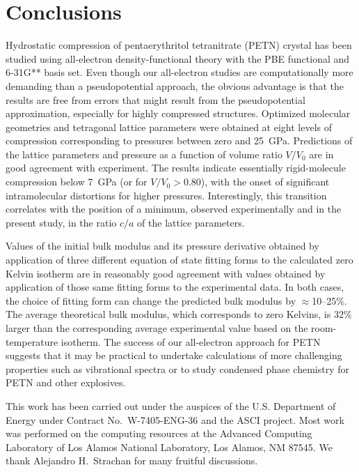 \documentclass[prb,aps,nobibnotes,twocolumn,doublespace,twocolumngrid,superbib]{revtex4}
\begin{document}
\section{Conclusions}
\label{sec:conclusions}
Hydrostatic compression of pentaerythritol tetranitrate (PETN) crystal
has been studied using all-electron density-functional theory with the
PBE functional and 6-31G** basis set. Even though our all-electron
studies are computationally more demanding than a pseudopotential
approach, the obvious advantage is that the results are free from
errors that might result from the pseudopotential approximation,
especially for highly compressed structures.  Optimized molecular
geometries and tetragonal lattice parameters were obtained at eight
levels of compression corresponding to pressures between zero and
25~GPa.  Predictions of the lattice parameters and pressure as a
function of volume ratio $V/V_0$ are in good agreement with
experiment. The results indicate essentially rigid-molecule
compression below 7~GPa (or for $V/V_0 > 0.80$), with the onset of
significant intramolecular distortions for higher pressures.  
Interestingly, this transition correlates with the position of a
minimum, observed experimentally and in the present study, in the 
ratio $c/a$ of the lattice parameters.

Values of the initial bulk modulus and its pressure derivative
obtained by application of three different equation of state fitting
forms to the calculated zero Kelvin isotherm are in reasonably good
agreement with values obtained by application of those same fitting
forms to the experimental data.  In both cases, the choice of fitting
form can change the predicted bulk modulus by $\approx$10--25\%.  The
average theoretical bulk modulus, which corresponds to zero Kelvins,
is 32\% larger than the corresponding average experimental value based
on the room-temperature isotherm.  The success of our all-electron
approach for PETN suggests that it may be practical to undertake 
calculations of more challenging properties such as vibrational spectra 
or to study condensed phase chemistry for PETN and other explosives.

\begin{acknowledgments}
This work has been carried out under the auspices of the
U.S. Department of Energy under Contract No.~W-7405-ENG-36 and the
ASCI project.  Most work was performed on the computing resources at
the Advanced Computing Laboratory of Los Alamos National Laboratory,
Los Alamos, NM 87545.  We thank Alejandro H.~Strachan for many
fruitful discussions.
\end{acknowledgments}
\end{document}
